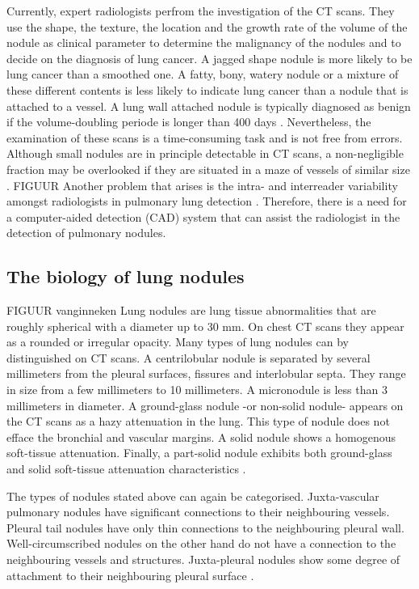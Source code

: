 Currently, expert radiologists perfrom the investigation of the
CT scans. They use the shape, the texture, the location and the growth rate of
the volume of the nodule as clinical parameter to determine the malignancy of
the nodules and to decide on the diagnosis of lung cancer. A jagged shape
nodule is more likely to be lung cancer than a smoothed one. A fatty, bony,
watery nodule or a mixture of these different contents is less likely to
indicate lung cancer than a nodule that is attached to a vessel. A lung wall
attached nodule is typically diagnosed as benign if the volume-doubling periode
is longer than 400 days \cite{wu}. Nevertheless, the examination of these scans
is a time-consuming task and is not free from errors. Although small nodules are
in principle detectable in CT scans, a non-negligible fraction may be overlooked
if they are situated in a maze of vessels of similar size \cite{ozekes}.
FIGUUR
Another problem that arises is the intra- and interreader variability
amongst radiologists in pulmonary lung detection \cite{armato} \cite{hens}. Therefore,
there is a need for a computer-aided detection (CAD) system that can assist the
radiologist in the detection of pulmonary nodules.

\subsection{The biology of lung nodules}
FIGUUR vanginneken
Lung nodules are lung tissue abnormalities that are roughly spherical with a
diameter up to 30 mm. On chest CT scans they appear as a rounded or
irregular opacity. Many types of lung nodules can by distinguished on CT scans.
A centrilobular nodule is separated by several millimeters from the pleural surfaces, fissures and
interlobular septa. They range in size from a few millimeters to 10 millimeters.
A micronodule is less than 3 millimeters in diameter. A ground-glass nodule -or
non-solid nodule- appears on the CT scans as a hazy attenuation in the lung.
This type of nodule does not efface the bronchial and vascular margins. A solid
nodule shows a homogenous soft-tissue attenuation. Finally, a part-solid nodule
exhibits both ground-glass and solid soft-tissue attenuation characteristics
\cite{nodule}. 

The types of nodules stated above can again be categorised. Juxta-vascular
pulmonary nodules have significant connections to their neighbouring vessels.
Pleural tail nodules have only thin connections to the neighbouring pleural
wall. Well-circumscribed nodules on the other hand do not have a connection to
the neighbouring vessels and structures. Juxta-pleural nodules show some degree
of attachment to their neighbouring pleural surface \cite{kostis}.

